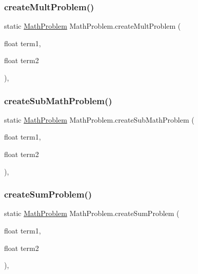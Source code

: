 \mbox{\label{classMathProblem_a63bcf12dc631ce2b79be84d49a395d6a}} 
\subsubsection{\texorpdfstring{create\+Mult\+Problem()}{createMultProblem()}}
{\footnotesize\ttfamily static \hyperlink{classMathProblem}{Math\+Problem} Math\+Problem.\+create\+Mult\+Problem (\begin{DoxyParamCaption}\item[{float}]{term1,  }\item[{float}]{term2 }\end{DoxyParamCaption})\hspace{0.3cm}{\ttfamily [inline]}, {\ttfamily [static]}}

\mbox{\label{classMathProblem_a6af8bad86aefc7d88a39720b809ab548}} 
\subsubsection{\texorpdfstring{create\+Sub\+Math\+Problem()}{createSubMathProblem()}}
{\footnotesize\ttfamily static \hyperlink{classMathProblem}{Math\+Problem} Math\+Problem.\+create\+Sub\+Math\+Problem (\begin{DoxyParamCaption}\item[{float}]{term1,  }\item[{float}]{term2 }\end{DoxyParamCaption})\hspace{0.3cm}{\ttfamily [inline]}, {\ttfamily [static]}}

\mbox{\label{classMathProblem_aa7d3d5ebabc462ff772bcf9a39bac92f}} 
\subsubsection{\texorpdfstring{create\+Sum\+Problem()}{createSumProblem()}}
{\footnotesize\ttfamily static \hyperlink{classMathProblem}{Math\+Problem} Math\+Problem.\+create\+Sum\+Problem (\begin{DoxyParamCaption}\item[{float}]{term1,  }\item[{float}]{term2 }\end{DoxyParamCaption})\hspace{0.3cm}{\ttfamily [inline]}, {\ttfamily [static]}}

